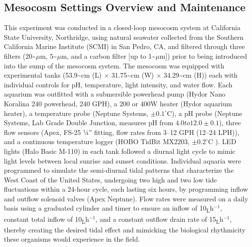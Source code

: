 \documentclass{CSUNthesis}
\begin{document}
\subsection*{Mesocosm Settings Overview and Maintenance}\label{mesocosm-settings-overview-and-maintenance}

This experiment was conducted in a closed-loop mesocosm system at California State University, Northridge, using natural seawater collected from the Southern California Marine Institute (SCMI) in San Pedro, CA, and filtered through three filters (20\textasciitilde{}\(\mu\)m, 5\textasciitilde{}\(\mu\)m, and a carbon filter {[}up to 1\textasciitilde{}\(\mu\)m{]}) prior to being introduced into the sump of the mesocosm system. The mesocosm was equipped with experimental tanks (53.9\textasciitilde cm (L) \(\times\) 31.75\textasciitilde cm (W) \(\times\) 34.29\textasciitilde cm (H)) each with individual controls for pH, temperature, light intensity, and water flow. Each aquarium was outfitted with a submersible powerhead pump (Hydor Nano Koralina 240 powerhead, 240 GPH), a 200 or 400W heater (Hydor aquarium heater), a temperature probe (Neptune Systems, \(\pm 0.1^\circ\)C), a pH probe (Neptune Systems, Lab Grade Double Junction, measures pH from \(4.0 to 12.0 \pm 0.1\)), three flow sensors (Apex, FS-25 ¼'' fitting, flow rates from 3--12 GPH (12--24 LPH)), and a continuous temperature logger (HOBO TidBit MX2203, \(\pm 0.2^\circ\)C ). LED lights (Halo Basic M-110) in each tank followed a diurnal light cycle to mimic light levels between local sunrise and sunset conditions. Individual aquaria were programmed to simulate the semi-diurnal tidal patterns that characterize the West Coast of the United States, undergoing two high and two low tide fluctuations within a 24-hour cycle, each lasting six hours, by programming inflow and outflow solenoid valves (Apex Neptune). Flow rates were measured on a daily basis using a graduated cylinder and timer to ensure an inflow of 10\textsubscript{L}h\(^{-1}\), constant total inflow of 10\textsubscript{L}h\(^{-1}\), and a constant outflow drain rate of 15\textsubscript{L}h\(^{-1}\), thereby creating the desired tidal effect and mimicking the biological rhythmicity these organisms would experience in the field.
\end{document}
